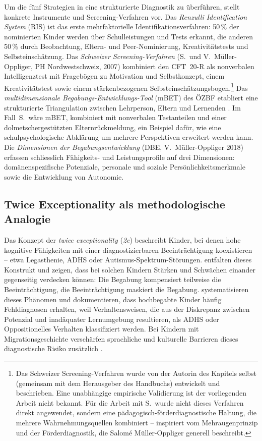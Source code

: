 \documentclass[ngerman, a4paper]{article}
\begin{document}
Um die fünf Strategien in eine strukturierte Diagnostik zu überführen,
stellt \textcite[S.\,231--235]{muelleroppliger2021paeddiagnostik}
konkrete Instrumente und Screening-Verfahren vor. Das \textit{Renzulli
Identification System} (RIS) ist das erste mehrfaktorielle
Identifikationsverfahren: 50\,\% der nominierten Kinder werden über
Schulleistungen und Tests erkannt, die anderen 50\,\% durch Beobachtung,
Eltern- und Peer-Nominierung, Kreativitätstests und Selbsteinschätzung.
Das \textit{Schweizer Screening-Verfahren} (S.\ und V.\ Müller-Oppliger,
PH Nordwestschweiz, 2007) kombiniert den CFT~20-R als nonverbalen
Intelligenztest mit Fragebögen zu Motivation und Selbstkonzept, einem
Kreativitätstest sowie einem stärkenbezogenen
Selbsteinschätzungsbogen.\footnote{Das Schweizer Screening-Verfahren
wurde von der Autorin des Kapitels selbst (gemeinsam mit dem
Herausgeber des Handbuchs) entwickelt und beschrieben. Eine
unabhängige empirische Validierung ist der vorliegenden Arbeit nicht
bekannt. Für die Arbeit mit S.\ wurde nicht dieses Verfahren direkt
angewendet, sondern eine pädagogisch-förderdiagnostische Haltung, die
mehrere Wahrnehmungsquellen kombiniert -- inspiriert vom
Mehraugenprinzip und der Förderdiagnostik, die Salomé
Müller-Oppliger generell beschreibt.}
Das \textit{multidimensionale Begabungs-Entwicklungs-Tool} (mBET) des
ÖZBF etabliert eine strukturierte Triangulation zwischen Lehrperson,
Eltern und Lernenden \parencite[S.\,252--259]{stahl2021mbet}. Im Fall~S.\ wäre mBET,
kombiniert mit nonverbalen Testanteilen und einer dolmetschergestützten
Elternrückmeldung, ein Beispiel dafür, wie eine schulpsychologische
Abklärung um mehrere Perspektiven erweitert werden kann. Die
\textit{Dimensionen der Begabungsentwicklung} (DBE, V.\ Müller-Oppliger
2018) erfassen schliesslich Fähigkeits- und Leistungsprofile auf drei
Dimensionen: domänenspezifische Potenziale, personale und soziale
Persönlichkeitsmerkmale sowie die Entwicklung von Autonomie.

\subsection{Twice Exceptionality als methodologische Analogie}
\label{subsec:2e}

Das Konzept der \textit{twice exceptionality} (\textit{2e}) beschreibt
Kinder, bei denen hohe kognitive Fähigkeiten mit einer diagnostizierbaren
Beeinträchtigung koexistieren -- etwa Legasthenie, ADHS oder
Autismus-Spektrum-Störungen.
\textcite[S.\,588--600]{baumschader2021twice} entfalten dieses Konstrukt
und zeigen, dass bei solchen Kindern Stärken und Schwächen einander
gegenseitig verdecken können: Die Begabung kompensiert teilweise die
Beeinträchtigung, die Beeinträchtigung maskiert die Begabung.
\textcite[S.\,87--94]{webb2020doppeldiagnosen} systematisieren dieses
Phänomen und dokumentieren, dass hochbegabte Kinder häufig Fehldiagnosen
erhalten, weil Verhaltensweisen, die aus der Diskrepanz zwischen Potenzial
und inadäquater Lernumgebung resultieren, als ADHS oder Oppositionelles
Verhalten klassifiziert werden. Bei Kindern mit Migrationsgeschichte
verschärfen sprachliche und kulturelle Barrieren dieses diagnostische
Risiko zusätzlich \parencite[S.\,576--587]{stamm2021fehlenderblick}.
\end{document}
